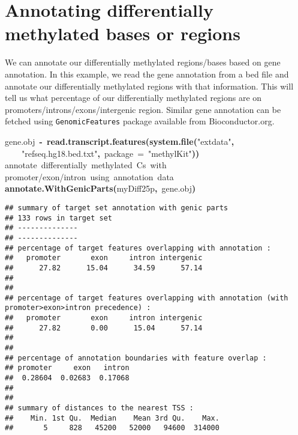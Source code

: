 \documentclass{article}
\makeatletter
\newcommand{\hlfunctioncall}[1]{\textcolor[rgb]{.5,0,.33}{\textbf{#1}}}%
\newcommand{\hlstring}[1]{\textcolor[rgb]{.6,.6,1}{#1}}%
\newcommand{\hlkeyword}[1]{\textbf{#1}}%
\newcommand{\hlargument}[1]{\textcolor[rgb]{.69,.25,.02}{#1}}%
\newcommand{\hlcomment}[1]{\textcolor[rgb]{.18,.6,.34}{#1}}%
\newcommand{\hlassignement}[1]{\textbf{#1}}%
\newcommand{\hlsymbol}[1]{#1}%
\newcommand{\hlstd}[1]{\textcolor[rgb]{0,0,0}{#1}}%
\newenvironment{kframe}{%
 \def\FrameCommand##1{\hskip\@totalleftmargin \hskip-\fboxsep
 \colorbox{shadecolor}{##1}\hskip-\fboxsep
     \hskip-\linewidth \hskip-\@totalleftmargin \hskip\columnwidth}%
 \MakeFramed {\advance\hsize-\width
   \@totalleftmargin\z@ \linewidth\hsize
   \@setminipage}}%
 {\par\unskip\endMakeFramed}
\newenvironment{knitrout}{}{} %
\makeatother
\begin{document}
\section{Annotating differentially methylated bases or regions}
We can annotate our differentially methylated regions/bases based on gene annotation. In this example, we read the gene annotation from a bed file and annotate our differentially methylated regions with that information. This will tell us what percentage of our differentially methylated regions are on promoters/introns/exons/intergenic region. Similar gene annotation can be fetched using \texttt{GenomicFeatures} package available from Bioconductor.org.

\begin{knitrout}
\color{fgcolor}\begin{kframe}
\begin{flushleft}
\ttfamily\noindent
\hlsymbol{gene.obj}{\ }\hlassignement{\usebox{\hlnormalsizeboxlessthan}-}{\ }\hlfunctioncall{read.transcript.features}\hlkeyword{(}\hlfunctioncall{system.file}\hlkeyword{(}\hlstring{"{}extdata"{}}\hlkeyword{,}\hspace*{\fill}\\
\hlstd{}{\ }{\ }{\ }{\ }\hlstring{"{}refseq.hg18.bed.txt"{}}\hlkeyword{,}{\ }\hlargument{package}{\ }\hlargument{=}{\ }\hlstring{"{}methylKit"{}}\hlkeyword{)}\hlkeyword{)}\hspace*{\fill}\\
\hlstd{}\hlcomment{\usebox{\hlnormalsizeboxhash}{\ }annotate{\ }differentially{\ }methylated{\ }Cs{\ }with}\hspace*{\fill}\\
\hlstd{}\hlcomment{\usebox{\hlnormalsizeboxhash}{\ }promoter/exon/intron{\ }using{\ }annotation{\ }data}\hspace*{\fill}\\
\hlstd{}\hlfunctioncall{annotate.WithGenicParts}\hlkeyword{(}\hlsymbol{myDiff25p}\hlkeyword{,}{\ }\hlsymbol{gene.obj}\hlkeyword{)}\mbox{}
\normalfont
\end{flushleft}
\begin{verbatim}
## summary of target set annotation with genic parts
## 133 rows in target set
## --------------
## --------------
## percentage of target features overlapping with annotation :
##   promoter       exon     intron intergenic 
##      27.82      15.04      34.59      57.14 
## 
## 
## percentage of target features overlapping with annotation (with promoter>exon>intron precedence) :
##   promoter       exon     intron intergenic 
##      27.82       0.00      15.04      57.14 
## 
## 
## percentage of annotation boundaries with feature overlap :
## promoter     exon   intron 
##  0.28604  0.02683  0.17068 
## 
## 
## summary of distances to the nearest TSS :
##    Min. 1st Qu.  Median    Mean 3rd Qu.    Max. 
##       5     828   45200   52000   94600  314000 
\end{verbatim}
\end{kframe}
\end{knitrout}
\end{document}
